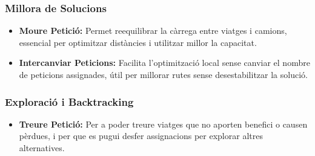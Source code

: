 \vspace{0.5cm}

\subsubsection{Millora de Solucions}
\begin{itemize}
    \item \textbf{Moure Petició:} Permet reequilibrar la càrrega entre viatges i camions, essencial per optimitzar distàncies i utilitzar millor la capacitat.
    \item \textbf{Intercanviar Peticions:} Facilita l'optimització local sense canviar el nombre de peticions assignades, útil per millorar rutes sense desestabilitzar la solució.
\end{itemize}

\vspace{0.5cm}

\subsubsection{Exploració i Backtracking}
\begin{itemize}
    \item \textbf{Treure Petició:} Per a poder treure viatges que no aporten benefici o causen pèrdues, i per que es pugui desfer assignacions per explorar altres alternatives.
\end{itemize}
